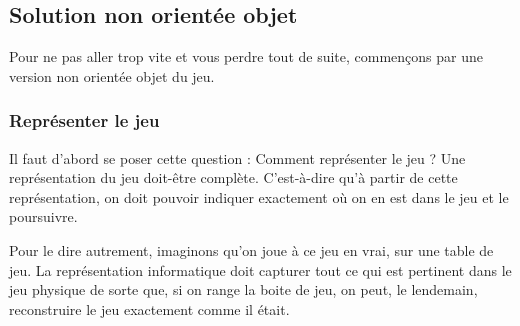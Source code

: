 	\subsection{Solution non orientée objet}
	
		Pour ne pas aller trop vite et vous perdre tout de suite,
		commençons par une version non orientée objet du jeu.
		
		\subsubsection*{Représenter le jeu}

			Il faut d'abord se poser cette question :
			Comment représenter le jeu ?
			Une représentation du jeu doit-être complète.
			C'est-à-dire qu'à partir de cette représentation,
			on doit pouvoir indiquer exactement où on en est dans le jeu
			et le poursuivre.
			
			Pour le dire autrement, 
			imaginons qu'on joue à ce jeu \og{}en vrai\fg{}, sur une table de jeu.
			La représentation informatique doit capturer tout ce qui est pertinent
			dans le jeu physique de sorte que, si on range la boite de jeu,
			on peut, le lendemain, reconstruire le jeu exactement comme il était.
			

